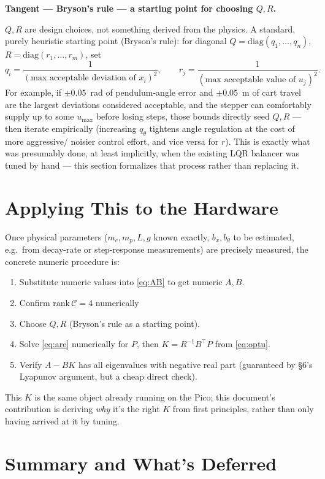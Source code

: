 \documentclass[11pt]{article}
\newenvironment{tangent}[1]{%
  \par\smallskip\noindent\hrulefill\par
  \noindent\textbf{Tangent — #1.}\par\smallskip
  \begingroup\itshape
}{%
  \endgroup
  \par\noindent\hrulefill\par\smallskip
}
\begin{document}
\begin{tangent}{Bryson's rule — a starting point for choosing $Q,R$}
$Q,R$ are design choices, not something derived from the physics. A
standard, purely heuristic starting point (Bryson's rule): for diagonal
$Q=\mathrm{diag}(q_1,\dots,q_n)$, $R=\mathrm{diag}(r_1,\dots,r_m)$, set
\[
  q_i = \frac{1}{(\text{max acceptable deviation of } x_i)^2}, \qquad
  r_j = \frac{1}{(\text{max acceptable value of } u_j)^2}.
\]
For example, if $\pm0.05$~rad of pendulum-angle error and $\pm0.05$~m of
cart travel are the largest deviations considered acceptable, and the
stepper can comfortably supply up to some $u_{\max}$ before losing steps,
those bounds directly seed $Q,R$ — then iterate empirically (increasing
$q_\theta$ tightens angle regulation at the cost of more aggressive/
noisier control effort, and vice versa for $r$). This is exactly what was
presumably done, at least implicitly, when the existing LQR balancer was
tuned by hand — this section formalizes that process rather than replacing
it.
\end{tangent}

\section{Applying This to the Hardware}

Once physical parameters ($m_c,m_p,L,g$ known exactly,
$b_x,b_\theta$ to be estimated, e.g.\ from decay-rate or step-response
measurements) are precisely measured, the concrete numeric procedure is:
\begin{enumerate}[leftmargin=*]
  \item Substitute numeric values into \eqref{eq:AB} to get numeric
  $A,B$.
  \item Confirm $\mathrm{rank}\,\mathcal C = 4$ numerically
  \item Choose $Q,R$ (Bryson's rule as a starting point).
  \item Solve \eqref{eq:are} numerically for $P$, then $K=R^{-1}B^\top P$
  from \eqref{eq:optu}.
  \item Verify $A-BK$ has all eigenvalues with negative real part
  (guaranteed by \S6's Lyapunov argument, but a cheap direct check).
\end{enumerate}
This $K$ is the same object already running on the Pico; this document's
contribution is deriving \emph{why} it's the right $K$ from first
principles, rather than only having arrived at it by tuning.

\section{Summary and What's Deferred}
\end{document}
